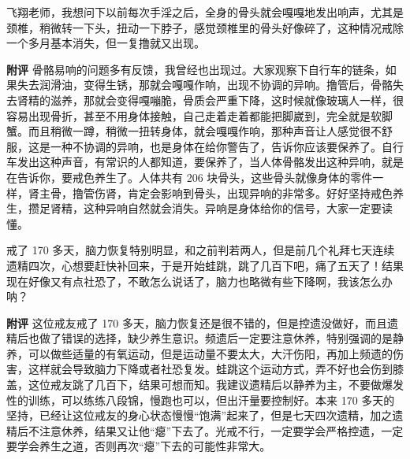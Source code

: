 \begin{case}
    飞翔老师，我想问下以前每次手淫之后，全身的骨头就会嘎嘎地发出响声，尤其是颈椎，稍微转一下头，扭动一下脖子，感觉颈椎里的骨头好像碎了，这种情况戒除一个多月基本消失，但一复撸就又出现。

    \textbf{附评} 骨骼易响的问题多有反馈，我曾经也出现过。大家观察下自行车的链条，如果失去润滑油，变得生锈，那就会嘎嘎作响，出现不协调的异响。撸管后，骨骼失去肾精的滋养，那就会变得嘎嘣脆，骨质会严重下降，这时候就像玻璃人一样，很容易出现骨折，甚至不用身体接触，自己走着走着都能把脚崴到，完全就是软脚蟹。而且稍微一蹲，稍微一扭转身体，就会嘎嘎作响，那种声音让人感觉很不舒服，这是一种不协调的异响，也是身体在给你警告了，告诉你应该要保养了。自行车发出这种声音，有常识的人都知道，要保养了，当人体骨骼发出这种异响，就是在告诉你，要戒色养生了。人体共有 206 块骨头，这些骨头就像身体的零件一样，肾主骨，撸管伤肾，肯定会影响到骨头，出现异响的非常多。好好坚持戒色养生，攒足肾精，这种异响自然就会消失。异响是身体给你的信号，大家一定要读懂。
\end{case}

\begin{case}
    戒了 170 多天，脑力恢复特别明显，和之前判若两人，但是前几个礼拜七天连续遗精四次，心想要赶快补回来，于是开始蛙跳，跳了几百下吧，痛了五天了！结果现在好像又有点社恐了，不敢怎么说话了，脑力也略微有些下降啊，我该怎么办呐？

    \textbf{附评} 这位戒友戒了 170 多天，脑力恢复还是很不错的，但是控遗没做好，而且遗精后也做了错误的选择，缺少养生意识。频遗后一定要注意休养，特别强调的是静养，可以做些适量的有氧运动，但是运动量不要太大，大汗伤阳，再加上频遗的伤害，这样就会导致脑力下降或者社恐复发。蛙跳这个运动方式，弄不好也会伤到膝盖，这位戒友跳了几百下，结果可想而知。我建议遗精后以静养为主，不要做爆发性的训练，可以练练八段锦，慢跑也可以，但出汗量要控制好。本来 170 多天的坚持，已经让这位戒友的身心状态慢慢“饱满”起来了，但是七天四次遗精，加之遗精后不注意休养，结果又让他“瘪”下去了。光戒不行，一定要学会严格控遗，一定要学会养生之道，否则再次“瘪”下去的可能性非常大。
\end{case}

